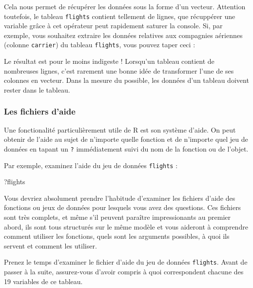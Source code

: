 \documentclass[a4paperpaper,]{article}
\newenvironment{Shaded}{\begin{snugshade}}{\end{snugshade}}
\newcommand{\OperatorTok}[1]{\textcolor[rgb]{0.81,0.36,0.00}{\textbf{#1}}}
\newcommand{\NormalTok}[1]{#1}
\theoremstyle{definition}
\theoremstyle{definition}
\theoremstyle{definition}
\theoremstyle{remark}
\begin{document}
Cela nous permet de récupérer les données sous la forme d'un vecteur.
Attention toutefois, le tableau \texttt{flights} contient tellement de
lignes, que récuppérer une variable grâce à cet opérateur peut
rapidement saturer la console. Si, par exemple, vous souhaitez extraire
les données relatives aux compagnies aériennes (colonne
\texttt{carrier}) du tableau \texttt{flights}, vous pouvez taper ceci :

\begin{Shaded}
\end{Shaded}

Le résultat est pour le moins indigeste ! Lorsqu'un tableau contient de
nombreuses lignes, c'est rarement une bonne idée de transformer l'une de
ses colonnes en vecteur. Dans la mesure du possible, les données d'un
tableau doivent rester dans le tableau.

\subsubsection{Les fichiers d'aide}\label{les-fichiers-daide}

Une fonctionalité particulièrement utile de R est son système d'aide. On
peut obtenir de l'aide au sujet de n'importe quelle fonction et de
n'importe quel jeu de données en tapant un \texttt{?} immédiatement
suivi du nom de la fonction ou de l'objet.

Par exemple, examinez l'aide du jeu de données \texttt{flights} :

\begin{Shaded}
\begin{Highlighting}[]
\NormalTok{?flights}
\end{Highlighting}
\end{Shaded}

Vous devriez absolument prendre l'habitude d'examiner les fichiers
d'aide des fonctions ou jeux de données pour lesquels vous avez des
questions. Ces fichiers sont très complets, et même s'il peuvent
paraître impressionants au premier abord, ils sont tous structurés sur
le même modèle et vous aideront à comprendre comment utiliser les
fonctions, quels sont les arguments possibles, à quoi ils servent et
comment les utiliser.

Prenez le temps d'examiner le fichier d'aide du jeu de données
\texttt{flights}. Avant de passer à la suite, assurez-vous d'avoir
compris à quoi correspondent chacune des 19 variables de ce tableau.
\end{document}
